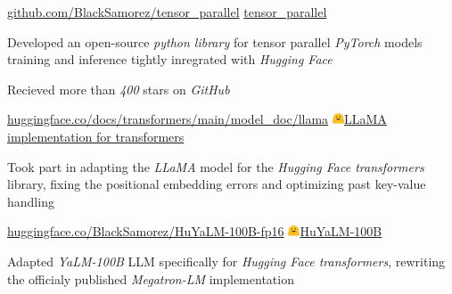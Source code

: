 
\begin{cventries}
  \cventry
    {\href{https://github.com/BlackSamorez/tensor_parallel}{\url{github.com/BlackSamorez/tensor_parallel}}} %
    {\faGithub\acvHeaderIconSep\href{https://github.com/BlackSamorez/tensor_parallel}{tensor\_parallel}} %
    {} %
    {} %
    {
      \begin{cvitems} %
        \item { Developed an open-source \textit{python library} for tensor parallel \textit{PyTorch} models training and inference tightly inregrated with \textit{Hugging Face} }
        \item { Recieved more than \textit{400} stars on \textit{GitHub} }
      \end{cvitems}
    }

  \cventry
    {\href{https://huggingface.co/docs/transformers/main/model_doc/llama}{\url{huggingface.co/docs/transformers/main/model_doc/llama}}} %
    {\includegraphics[width=3.5mm]{hf.jpg}\acvHeaderIconSep\href{https://huggingface.co/docs/transformers/main/model_doc/llama}{LLaMA implementation for transformers}} %
    {} %
    {} %
    {
      \begin{cvitems} %
        \item {Took part in adapting the \textit{LLaMA} model for the \textit{Hugging Face transformers} library, fixing the positional embedding errors and optimizing past key-value handling}
      \end{cvitems}
    }

  \cventry
    {\href{https://huggingface.co/BlackSamorez/HuYaLM-100B-fp16}{\url{huggingface.co/BlackSamorez/HuYaLM-100B-fp16}}} %
    {\includegraphics[width=3.5mm]{hf.jpg}\acvHeaderIconSep\href{https://huggingface.co/BlackSamorez/HuYaLM-100B-fp16}{HuYaLM-100B}} %
    {} %
    {} %
    {
      \begin{cvitems} %
        \item { Adapted \textit{YaLM-100B} LLM specifically for \textit{Hugging Face transformers}, rewriting the officialy published \textit{Megatron-LM} implementation }
      \end{cvitems}
    }
    

\end{cventries}
